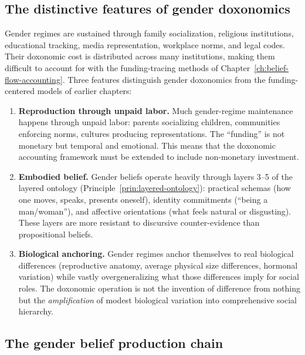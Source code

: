\subsection{The distinctive features of gender doxonomics}

Gender regimes are sustained through family socialization, religious institutions, educational tracking, media representation, workplace norms, and legal codes.
Their doxonomic cost is distributed across many institutions, making them difficult to account for with the funding-tracing methods of Chapter~\ref{ch:belief-flow-accounting}.
Three features distinguish gender doxonomics from the funding-centered models of earlier chapters:

\begin{enumerate}
  \item \textbf{Reproduction through unpaid labor.}
  Much gender-regime maintenance happens through unpaid labor: parents socializing children, communities enforcing norms, cultures producing representations.
  The ``funding'' is not monetary but temporal and emotional.
  This means that the doxonomic accounting framework must be extended to include non-monetary investment.

  \item \textbf{Embodied belief.}
  Gender beliefs operate heavily through layers 3--5 of the layered ontology (Principle~\ref{prin:layered-ontology}): practical schemas (how one moves, speaks, presents oneself), identity commitments (``being a man/woman''), and affective orientations (what feels natural or disgusting).
  These layers are more resistant to discursive counter-evidence than propositional beliefs.

  \item \textbf{Biological anchoring.}
  Gender regimes anchor themselves to real biological differences (reproductive anatomy, average physical size differences, hormonal variation) while vastly overgeneralizing what those differences imply for social roles.
  The doxonomic operation is not the invention of difference from nothing but the \emph{amplification} of modest biological variation into comprehensive social hierarchy.
\end{enumerate}

\subsection{The gender belief production chain}


